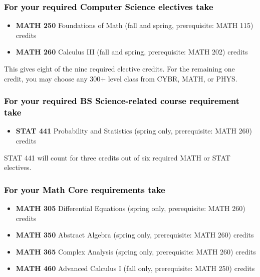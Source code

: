 \documentclass[9pt]{article}
\newenvironment{mypar}[2]
   {\begin{list}{}%
     {\setlength\leftmargin{#1}
     \setlength\rightmargin{#2}}
     \item[]}
   {\end{list}}
\begin{document}
\subsubsection*{\textcolor{black}{For your required Computer Science electives take}}

\begin{itemize}
\item \textbf{MATH 250} Foundations of Math (fall and spring, prerequisite: MATH 115)   credits
\item \textbf{MATH 260} Calculus III  (fall and spring, prerequisite: MATH 202)  credits
\end{itemize}
\begin{mypar}{0.5cm}{0.5cm} This gives eight of the nine required elective credits. For the remaining one credit, you may choose any 300+ level class from CYBR,  MATH, or PHYS.
\end{mypar}

\subsubsection*{\textcolor{black}{For your required BS Science-related course requirement take}}
\begin{itemize}
\item \textbf{STAT 441} Probability and Statistics (spring only, prerequisite: MATH 260)   credits
\end{itemize}
\begin{mypar}{0.5cm}{0.5cm} STAT 441 will count for three credits out of six required MATH or STAT electives.
\end{mypar}

\subsubsection*{\textcolor{black}{For your Math Core requirements take}}

\begin{itemize}
\item \textbf{MATH 305}	Differential Equations (spring only, prerequisite: MATH 260)  credits
\item \textbf{MATH 350}	Abstract Algebra (spring only, prerequisite: MATH 260)  credits
\item \textbf{MATH 365}	Complex Analysis (spring only,  prerequisite: MATH 260)  credits
\item \textbf{MATH 460}	Advanced Calculus I  (fall only,   prerequisite: MATH 250)  credits

\end{itemize}
\end{document}
